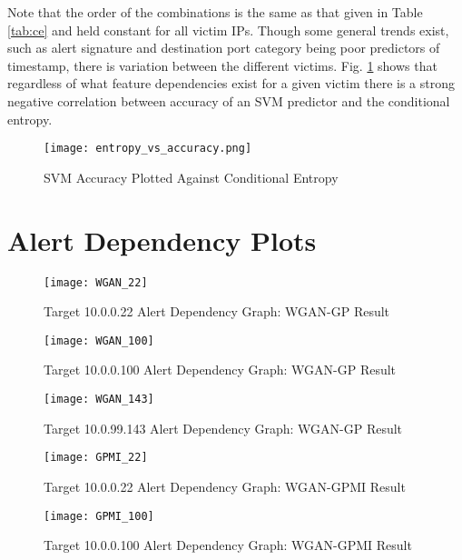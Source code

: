 \begin{appendices}
	Note that the order of the combinations is the same as that given in Table \ref{tab:ce} and held constant for all victim IPs. Though some general trends exist, such as alert signature and destination port category being poor predictors of timestamp, there is variation between the different victims. Fig. \ref{fig:entropy_v_accuracy} shows that regardless of what feature dependencies exist for a given victim there is a strong negative correlation between accuracy of an SVM predictor and the conditional entropy.
	
	\begin{figure}[!htbp]
		\centering
		\texttt{[image: entropy\_vs\_accuracy.png]}
		\caption{SVM Accuracy Plotted Against Conditional Entropy}
		\label{fig:entropy_v_accuracy}
	\end{figure}
	
	
\chapter{Alert Dependency Plots}
	\label{sec:depend_app}
	
	\begin{figure}[!htbp]
		\centering
		\texttt{[image: WGAN\_22]}
		\caption{
			Target 10.0.0.22 Alert Dependency Graph: WGAN-GP Result
		}
		\label{fig:alert_depend_2}
	\end{figure}
	
	\begin{figure}[!htbp]
		\centering
		\texttt{[image: WGAN\_100]}
		\caption{
			Target 10.0.0.100 Alert Dependency Graph: WGAN-GP Result
		}
		\label{fig:alert_depend_3}
	\end{figure}
	
	\begin{figure}[!htbp]
		\centering
		\texttt{[image: WGAN\_143]}
		\caption{
			Target 10.0.99.143 Alert Dependency Graph: WGAN-GP Result 
		}
		\label{fig:alert_depend_4}
	\end{figure}

	\begin{figure}[!htbp]
		\centering
		\texttt{[image: GPMI\_22]}
		\caption{
			Target 10.0.0.22 Alert Dependency Graph: WGAN-GPMI Result
		}
		\label{fig:alert_depend_6}
	\end{figure}
	
	\begin{figure}[!htbp]
		\centering
		\texttt{[image: GPMI\_100]}
		\caption{
			Target 10.0.0.100 Alert Dependency Graph: WGAN-GPMI Result
		}
		\label{fig:alert_depend_7}
	\end{figure}
	

\end{appendices}
